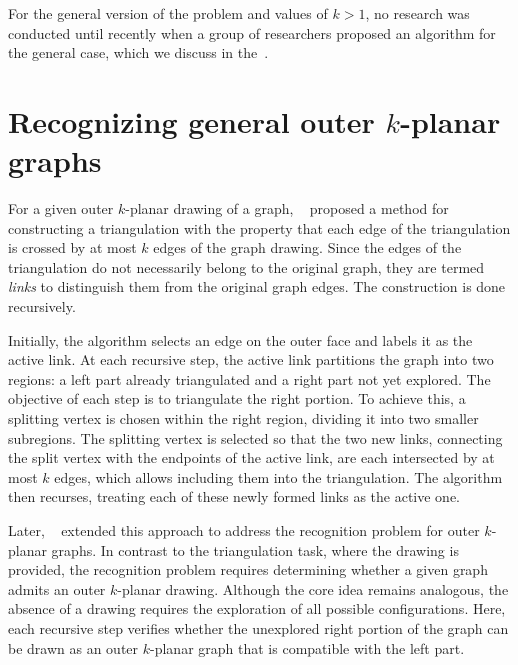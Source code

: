 For the general version of the problem and values of \(k > 1\), no research was conducted until recently when a group of researchers proposed an algorithm for the general case, which we discuss in the~.


\section{Recognizing general outer \texorpdfstring{\(k\)}{k}-planar graphs}\label{sec:recognizing-general-outer-(k)-planar-graphs}

For a given outer \(k\)-planar drawing of a graph, \citeauthor{triangulations}~\cite{triangulations} proposed a method for constructing a triangulation with the property that each edge of the triangulation is crossed by at most \(k\) edges of the graph drawing. Since the edges of the triangulation do not necessarily belong to the original graph, they are termed \emph{links} to distinguish them from the original graph edges. The construction is done recursively.

Initially, the algorithm selects an edge on the outer face and labels it as the active link. At each recursive step, the active link partitions the graph into two regions: a left part already triangulated and a right part not yet explored. The objective of each step is to triangulate the right portion. To achieve this, a splitting vertex is chosen within the right region, dividing it into two smaller subregions. The splitting vertex is selected so that the two new links, connecting the split vertex with the endpoints of the active link, are each intersected by at most \(k\) edges, which allows including them into the triangulation. The algorithm then recurses, treating each of these newly formed links as the active one.

Later, \citeauthor{okp}~\cite{okp} extended this approach to address the recognition problem for outer \(k\)-planar graphs. In contrast to the triangulation task, where the drawing is provided, the recognition problem requires determining whether a given graph admits an outer \(k\)-planar drawing. Although the core idea remains analogous, the absence of a drawing requires the exploration of all possible configurations. Here, each recursive step verifies whether the unexplored right portion of the graph can be drawn as an outer \(k\)-planar graph that is compatible with the left part.

